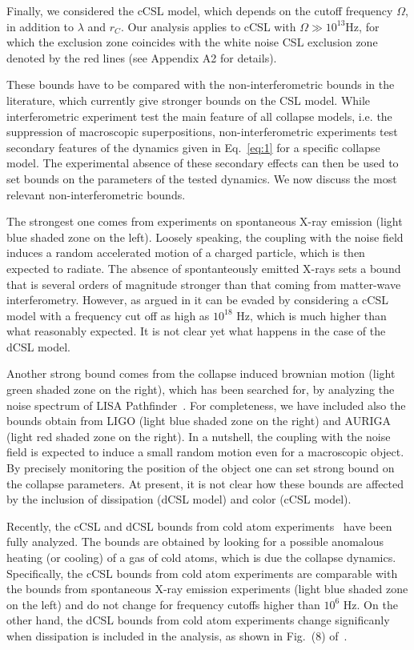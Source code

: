 \documentclass[prl,twocolumn,showpacs,superscriptaddress,groupedaddress]{revtex4}
\begin{document}
Finally, we considered the cCSL model, which depends on the cutoff frequency $\Omega$, in addition to $\lambda$ and $r_C$. Our analysis applies to cCSL with $\Omega \gg 10^{13}\text{Hz}$, for which the exclusion zone coincides with the white noise CSL exclusion zone denoted by the red lines (see Appendix A2 for details). 

These bounds have to be compared with the non-interferometric bounds in the literature, which currently give stronger bounds on the CSL model. While interferometric experiment test the main feature of all collapse models, i.e. the suppression of macroscopic superpositions, non-interferometric experiments test secondary features of the dynamics given in Eq.~\eqref{eq:1} for a specific collapse model. The experimental absence of these secondary effects can then be used to set bounds on the parameters of the tested dynamics. We now discuss the most relevant non-interferometric bounds.

The strongest one comes from experiments on spontaneous X-ray emission \cite{Curceanu} (light blue shaded zone on the left). Loosely speaking, the coupling with the noise field induces a random accelerated motion of a charged particle, which is then expected to radiate. The absence of spontanteously emitted X-rays sets a bound that is several orders of magnitude stronger than that coming from matter-wave interferometry. However, as argued in \cite{Donadi201470} it can be evaded by considering a cCSL model with a frequency cut off as high as $10^{18}$ Hz, which is much higher than what reasonably expected. It is not clear yet what happens in the case of the dCSL model. 

Another strong bound comes from the collapse induced brownian motion (light green shaded zone on the right), which has been searched for, by analyzing the noise spectrum of LISA Pathfinder~\cite{carlesso2016experimental}. For completeness, we have included also the bounds obtain from LIGO (light blue shaded zone on the right) and AURIGA (light red shaded zone on the right). In a nutshell, the coupling with the noise field is expected to induce a small random motion even for a macroscopic object. By precisely monitoring the position of the object one can set strong bound on the collapse parameters. At present, it is not clear how these bounds are affected by the inclusion of dissipation (dCSL model) and color (cCSL model). 

Recently, the cCSL and dCSL bounds from cold atom experiments~\cite{bilardello2016bounds} have been fully analyzed. The bounds are obtained by looking for a possible anomalous heating (or cooling) of a gas of cold atoms, which is due the collapse dynamics. Specifically, the cCSL bounds from cold atom experiments are comparable with the bounds from spontaneous X-ray emission experiments \cite{Curceanu} (light blue shaded zone on the left) and do not change for frequency cutoffs higher than $10^{6}$ Hz. On the other hand, the dCSL bounds from cold atom experiments change significanly when dissipation is included in the analysis, as shown in Fig.~(8) of~\cite{bilardello2016bounds}.
\end{document}
